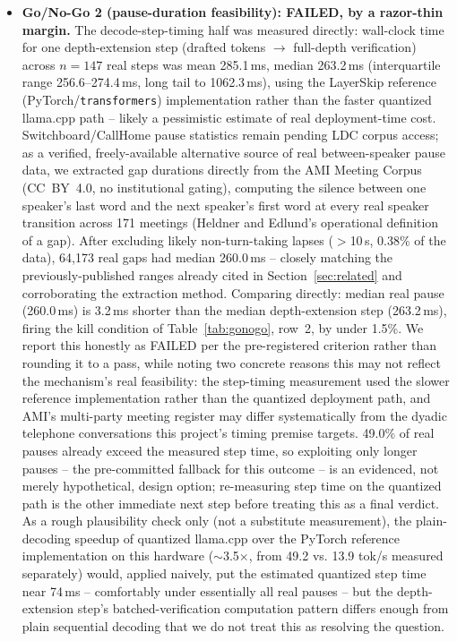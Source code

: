 \documentclass[journal]{IEEEtran}
\begin{document}
\begin{itemize}
    \item \textbf{Go/No-Go 2 (pause-duration feasibility): FAILED, by a razor-thin margin.} The decode-step-timing half was measured directly: wall-clock time for one depth-extension step (drafted tokens $\rightarrow$ full-depth verification) across $n=147$ real steps was mean 285.1\,ms, median 263.2\,ms (interquartile range 256.6--274.4\,ms, long tail to 1062.3\,ms), using the LayerSkip reference (PyTorch/\texttt{transformers}) implementation rather than the faster quantized llama.cpp path -- likely a pessimistic estimate of real deployment-time cost. Switchboard/CallHome pause statistics remain pending LDC corpus access; as a verified, freely-available alternative source of real between-speaker pause data, we extracted gap durations directly from the AMI Meeting Corpus~\cite{carletta2005ami} (CC~BY~4.0, no institutional gating), computing the silence between one speaker's last word and the next speaker's first word at every real speaker transition across 171 meetings (Heldner and Edlund's operational definition of a gap). After excluding likely non-turn-taking lapses ($>$10\,s, 0.38\% of the data), 64{,}173 real gaps had median 260.0\,ms -- closely matching the previously-published ranges already cited in Section~\ref{sec:related} and corroborating the extraction method. Comparing directly: median real pause (260.0\,ms) is 3.2\,ms shorter than the median depth-extension step (263.2\,ms), firing the kill condition of Table~\ref{tab:gonogo}, row~2, by under 1.5\%. We report this honestly as FAILED per the pre-registered criterion rather than rounding it to a pass, while noting two concrete reasons this may not reflect the mechanism's real feasibility: the step-timing measurement used the slower reference implementation rather than the quantized deployment path, and AMI's multi-party meeting register may differ systematically from the dyadic telephone conversations this project's timing premise targets. 49.0\% of real pauses already exceed the measured step time, so exploiting only longer pauses -- the pre-committed fallback for this outcome -- is an evidenced, not merely hypothetical, design option; re-measuring step time on the quantized path is the other immediate next step before treating this as a final verdict. As a rough plausibility check only (not a substitute measurement), the plain-decoding speedup of quantized llama.cpp over the PyTorch reference implementation on this hardware ($\sim$3.5$\times$, from 49.2 vs. 13.9 tok/s measured separately) would, applied naively, put the estimated quantized step time near 74\,ms -- comfortably under essentially all real pauses -- but the depth-extension step's batched-verification computation pattern differs enough from plain sequential decoding that we do not treat this as resolving the question.

\end{itemize}
\end{document}
